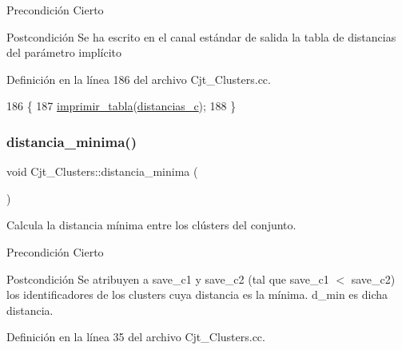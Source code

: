 \begin{DoxyPrecond}{Precondición}
Cierto 
\end{DoxyPrecond}
\begin{DoxyPostcond}{Postcondición}
Se ha escrito en el canal estándar de salida la tabla de distancias del parámetro implícito 
\end{DoxyPostcond}


Definición en la línea 186 del archivo Cjt\+\_\+\+Clusters.\+cc.


\begin{DoxyCode}
186                                                \{
187   \hyperlink{_cjt___clusters_8cc_a5cec9117fc9081104f0adb60b07b64e5}{imprimir\_tabla}(\hyperlink{class_cjt___clusters_a2b912c7987fd370bdeaf5dabb966240f}{distancias\_c});
188 \}
\end{DoxyCode}
\mbox{\label{class_cjt___clusters_ac0e4dd151f0bbd2954d44551330a8757}} 
\subsubsection{\texorpdfstring{distancia\+\_\+minima()}{distancia\_minima()}}
{\footnotesize\ttfamily void Cjt\+\_\+\+Clusters\+::distancia\+\_\+minima (\begin{DoxyParamCaption}{ }\end{DoxyParamCaption})\hspace{0.3cm}{\ttfamily [private]}}



Calcula la distancia mínima entre los clústers del conjunto. 

\begin{DoxyPrecond}{Precondición}
Cierto 
\end{DoxyPrecond}
\begin{DoxyPostcond}{Postcondición}
Se atribuyen a \textquotesingle{}save\+\_\+c1\textquotesingle{} y \textquotesingle{}save\+\_\+c2\textquotesingle{} (tal que save\+\_\+c1 $<$ save\+\_\+c2) los identificadores de los clusters cuya distancia es la mínima. \textquotesingle{}d\+\_\+min\textquotesingle{} es dicha distancia. 
\end{DoxyPostcond}


Definición en la línea 35 del archivo Cjt\+\_\+\+Clusters.\+cc.


